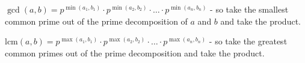 \documentclass{article}
\begin{document}
\begin{theorem}
    \( \gcd(a, b) = p^{\min(a_1, b_1)} \cdot p^{\min(a_2, b_2)} \cdot \ldots \cdot p^{\min(a_n, b_n)} \) - 
    so take the smallest common prime out of the prime decomposition of \( a \) and \( b \) and take the product.
\end{theorem}

\begin{theorem}
    \( \text{lcm}(a, b) = p^{\max(a_1, b_1)} \cdot p^{\max(a_2, b_2)} \cdot \ldots \cdot p^{\max(a_n, b_n)} \)
     - so take the greatest common primes out of the prime decomposition and take the product.
\end{theorem}

\end{document}
